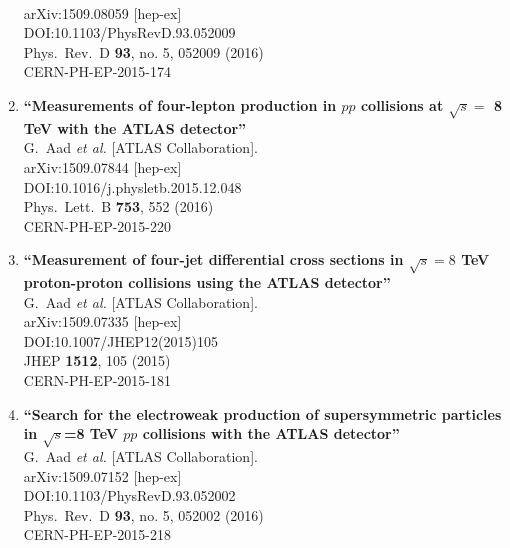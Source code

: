 \documentclass{article}
\begin{document}
\begin{enumerate}
  \\{}arXiv:1509.08059 [hep-ex]
  \\{}DOI:10.1103/PhysRevD.93.052009
  \\{}Phys.\ Rev.\ D {\bf 93}, no. 5, 052009 (2016)
  \\{}CERN-PH-EP-2015-174
\item%
{\bf ``Measurements of four-lepton production in $pp$ collisions at $\sqrt{s}=$ 8 TeV with the ATLAS detector''}
  \\{}G.~Aad {\it et al.} [ATLAS Collaboration].
  \\{}arXiv:1509.07844 [hep-ex]
  \\{}DOI:10.1016/j.physletb.2015.12.048
  \\{}Phys.\ Lett.\ B {\bf 753}, 552 (2016)
  \\{}CERN-PH-EP-2015-220
\item%
{\bf ``Measurement of four-jet differential cross sections in $\sqrt{s}=8$ TeV proton-proton collisions using the ATLAS detector''}
  \\{}G.~Aad {\it et al.} [ATLAS Collaboration].
  \\{}arXiv:1509.07335 [hep-ex]
  \\{}DOI:10.1007/JHEP12(2015)105
  \\{}JHEP {\bf 1512}, 105 (2015)
  \\{}CERN-PH-EP-2015-181
\item%
{\bf ``Search for the electroweak production of supersymmetric particles in $\sqrt{s}$=8 TeV $pp$ collisions with the ATLAS detector''}
  \\{}G.~Aad {\it et al.} [ATLAS Collaboration].
  \\{}arXiv:1509.07152 [hep-ex]
  \\{}DOI:10.1103/PhysRevD.93.052002
  \\{}Phys.\ Rev.\ D {\bf 93}, no. 5, 052002 (2016)
  \\{}CERN-PH-EP-2015-218

\end{enumerate}
\end{document}
